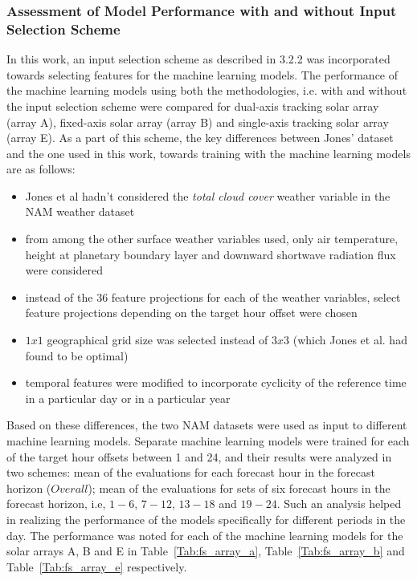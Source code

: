 \subsubsection*{Assessment of Model Performance with and without Input Selection Scheme}
\par In this work, an input selection scheme as described in 3.2.2 was incorporated towards selecting features for the machine learning models. The performance of the machine learning models using both the methodologies, i.e. with and without the input selection scheme were compared for dual-axis tracking solar array (array A), fixed-axis solar array (array B) and single-axis tracking solar array (array E). As a part of this scheme, the key differences between Jones' dataset and the one used in this work, towards training with the machine learning models are as follows:
\begin{itemize}
    \itemsep0em
    \item Jones et al hadn't considered the \textit{total cloud cover} weather variable in the NAM weather dataset
    \item from among the other surface weather variables used, only air temperature, height at planetary boundary layer and downward shortwave radiation flux were considered
    \item instead of the 36 feature projections for each of the weather variables, select feature projections depending on the target hour offset were chosen
    \item $1 x 1$ geographical grid size was selected instead of $3 x 3$ (which Jones et al. had found to be optimal)
    \item temporal features were modified to incorporate cyclicity of the reference time in a particular day or in a particular year
\end{itemize}

\par Based on these differences, the two NAM datasets were used as input to different machine learning models. Separate machine learning models were trained for each of the target hour offsets between 1 and 24, and their results were analyzed in two schemes: mean of the evaluations for each forecast hour in the forecast horizon ($Overall$); mean of the evaluations for sets of six forecast hours in the forecast horizon, i.e, $1 - 6$, $7 - 12$, $13 - 18$ and $19 - 24$. Such an analysis helped in realizing the performance of the models specifically for different periods in the day. The performance was noted for each of the machine learning models for the solar arrays A, B and E in Table~\ref{Tab:fs_array_a}, Table~\ref{Tab:fs_array_b} and Table~\ref{Tab:fs_array_e} respectively.

